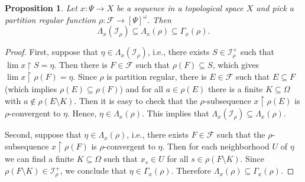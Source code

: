 \documentclass{amsart}
\theoremstyle{plain}
\newtheorem{prop}[thm]{Proposition}
\theoremstyle{definition}
\theoremstyle{remark}
\newcommand{\cF}{\mathcal{F}}
\newcommand{\cI}{\mathcal{I}}
\newcommand{\I}{\cI}
\begin{document}
\begin{prop}
\label{prop-lambda-ideal-in-lambda-rho}
Let $x: \Psi\to X$ be a sequence in a topological space $X$ 
and pick a partition regular function $\rho: \mathcal{F}\to [\Psi]^\omega$. Then 
\begin{equation*}
\Lambda_x({\I_\rho})\subseteq\Lambda_x(\rho)\subseteq\Gamma_x(\rho). %
\end{equation*}
\end{prop}

\begin{proof}
First, suppose that $\eta \in \Lambda_x({\I_\rho})$, i.e., there exists $S\in\I_\rho^+$ such that $\lim x\upharpoonright S=\eta$. Then there is $F\in\cF$ such that $\rho(F)\subseteq S$, which gives $\lim x\upharpoonright \rho(F)=\eta$. Since $\rho$ is partition regular, there is $E\in\cF$ such that $E\subseteq F$ (which implies $\rho(E)\subseteq\rho(F)$) and for all $a\in\rho(E)$ there is a finite $K\subseteq \Omega$ with $a\notin\rho(E\setminus K)$. Then it is easy to check that the $\rho$-subsequence $x\upharpoonright \rho(E)$ is $\rho$-convergent to $\eta$. Hence, $\eta\in\Lambda_x(\rho)$. This implies that $\Lambda_x({\I_\rho})\subseteq\Lambda_x(\rho)$. 

Second, suppose that $\eta\in\Lambda_x({\rho})$, i.e., there exists $F\in\cF$ such that the $\rho$-subsequence $x\upharpoonright \rho(F)$ is $\rho$-convergent to $\eta$. Then for each neighborhood $U$ of $\eta$ we can find a finite $K\subseteq \Omega$ such that $x_s\in U$ for all $s\in\rho(F\setminus K)$. Since $\rho(F\setminus K)\in\I^+_{\rho}$, we conclude that $\eta\in\Gamma_x(\rho)$. Therefore $\Lambda_x(\rho)\subseteq\Gamma_x(\rho)$. 
\end{proof}
\end{document}
